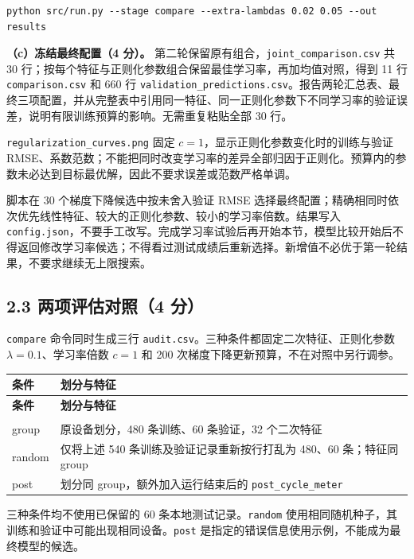 \documentclass[11pt,a4paper]{article}
\newcommand{\code}[1]{{\small\nolinkurl{#1}}}
\begin{document}
\par{}\noindent\begin{minipage}{\linewidth}
\begin{lstlisting}[aboveskip=0pt,belowskip=0pt]
python src/run.py --stage compare --extra-lambdas 0.02 0.05 --out results
\end{lstlisting}
\end{minipage}\par{}
\textbf{（c）冻结最终配置（4 分）。} 第二轮保留原有组合，\code{joint_comparison.csv} 共 30 行；按每个特征与正则化参数组合保留最佳学习率，再加均值对照，得到 11 行 \code{comparison.csv} 和 660 行 \code{validation_predictions.csv}。报告两轮汇总表、最终三项配置，并从完整表中引用同一特征、同一正则化参数下不同学习率的验证误差，说明有限训练预算的影响。无需重复粘贴全部 30 行。

\code{regularization_curves.png} 固定 $c=1$，显示正则化参数变化时的训练与验证 RMSE、系数范数；不能把同时改变学习率的差异全部归因于正则化。预算内的参数未必达到目标最优解，因此不要求误差或范数严格单调。

脚本在 30 个梯度下降候选中按未舍入验证 RMSE 选择最终配置；精确相同时依次优先线性特征、较大的正则化参数、较小的学习率倍数。结果写入 \code{config.json}，不要手工改写。完成学习率试验后再开始本节，模型比较开始后不得返回修改学习率候选；不得看过测试成绩后重新选择。新增值不必优于第一轮结果，不要求继续无上限搜索。


\subsection*{2.3 两项评估对照（4 分）}
\code{compare} 命令同时生成三行 \code{audit.csv}。三种条件都固定二次特征、正则化参数 $\lambda=0.1$、学习率倍数 $c=1$ 和 200 次梯度下降更新预算，不在对照中另行调参。


{\small\renewcommand{\arraystretch}{1.18}
\begin{longtable}{@{}>{\raggedright\arraybackslash}p{}>{\raggedright\arraybackslash}p{}@{}}
\toprule
\textbf{条件} & \textbf{划分与特征} \\
\midrule
\endfirsthead
\toprule
\textbf{条件} & \textbf{划分与特征} \\
\midrule
\endhead
\midrule
\multicolumn{2}{r}{\footnotesize 接下页}\\
\endfoot
\bottomrule
\endlastfoot
group & 原设备划分，480 条训练、60 条验证，32 个二次特征 \\
random & 仅将上述 540 条训练及验证记录重新按行打乱为 480、60 条；特征同 group \\
post & 划分同 group，额外加入运行结束后的 \code{post_cycle_meter} \\
\end{longtable}}
三种条件均不使用已保留的 60 条本地测试记录。\code{random} 使用相同随机种子，其训练和验证中可能出现相同设备。\code{post} 是指定的错误信息使用示例，不能成为最终模型的候选。
\end{document}
